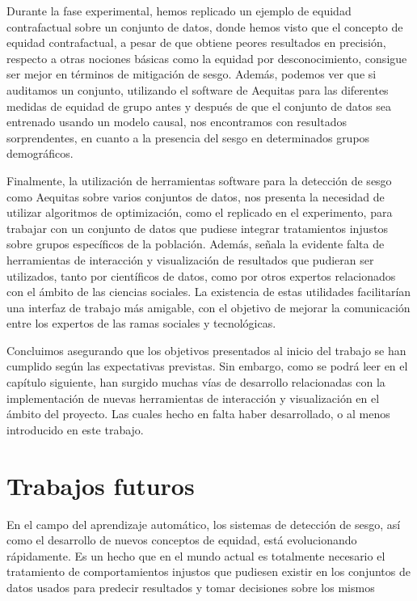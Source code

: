 \documentclass[oneside,openright,titlepage,numbers=noenddot,openany,headinclude,footinclude=true,
cleardoublepage=empty,abstractoff,BCOR=5mm,paper=a4,fontsize=12pt,main=spanish]{scrreprt}
\begin{document}
Durante la fase experimental, hemos replicado un ejemplo de equidad contrafactual sobre un conjunto de datos, donde hemos visto que el concepto de equidad contrafactual, a pesar de que obtiene peores resultados en precisión, respecto a otras nociones básicas como la equidad por desconocimiento, consigue ser mejor en términos de mitigación de sesgo. Además, podemos ver que si auditamos un conjunto, utilizando el software de Aequitas para las diferentes medidas de equidad de grupo antes y después de que el conjunto de datos sea entrenado usando un modelo causal, nos encontramos con resultados sorprendentes, en cuanto a la presencia del sesgo en determinados grupos demográficos.

Finalmente, la utilización de herramientas software para la detección de sesgo como Aequitas sobre varios conjuntos de datos, nos presenta la necesidad de utilizar algoritmos de optimización, como el replicado en el experimento, para trabajar con un conjunto de datos que pudiese integrar tratamientos injustos sobre grupos específicos de la población. Además, señala la evidente falta de herramientas de interacción y visualización de resultados que pudieran ser utilizados, tanto por científicos de datos, como por otros expertos relacionados con el ámbito de las ciencias sociales. La existencia de estas utilidades facilitarían una interfaz de trabajo más amigable, con el objetivo de mejorar la comunicación entre los expertos de las ramas sociales y tecnológicas.

Concluimos asegurando que los objetivos presentados al inicio del trabajo se han cumplido según las expectativas previstas. Sin embargo, como se podrá leer en el capítulo siguiente, han surgido muchas vías de desarrollo relacionadas con la implementación de nuevas herramientas de interacción y visualización en el ámbito del proyecto. Las cuales hecho en falta haber desarrollado, o al menos introducido en este trabajo.  

\chapter{Trabajos futuros} \label{ch:trabajos_fut}

En el campo del aprendizaje automático, los sistemas de detección de sesgo, así como el desarrollo de nuevos conceptos de equidad, está evolucionando rápidamente. Es un hecho que en el mundo actual es totalmente necesario el tratamiento de comportamientos injustos que pudiesen existir en los conjuntos de datos usados para predecir resultados y tomar decisiones sobre los mismos
\end{document}
